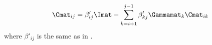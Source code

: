 \begin{equation}
  \Cmat_{ i j} = \beta_{i j}' \Imat  - \sum\limits^{j-1}_{k = i + 1} \beta'_{k j} \Gammamat_k \Cmat_{i k}
\end{equation}
where $\beta'_{ij}$ is the same as in .